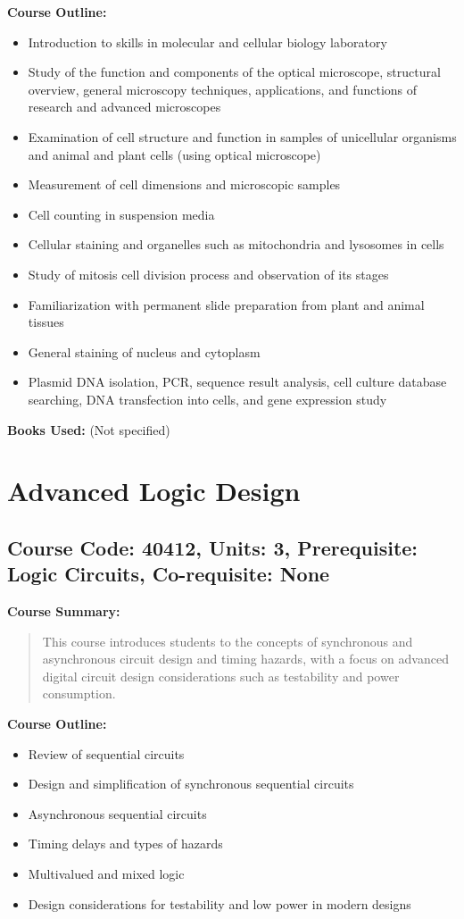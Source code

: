 \documentclass[12pt]{article}
\begin{document}
\textbf{Course Outline:}
\begin{itemize}
    \item Introduction to skills in molecular and cellular biology laboratory
    \item Study of the function and components of the optical microscope, structural overview, general microscopy techniques, applications, and functions of research and advanced microscopes
    \item Examination of cell structure and function in samples of unicellular organisms and animal and plant cells (using optical microscope)
    \item Measurement of cell dimensions and microscopic samples
    \item Cell counting in suspension media
    \item Cellular staining and organelles such as mitochondria and lysosomes in cells
    \item Study of mitosis cell division process and observation of its stages
    \item Familiarization with permanent slide preparation from plant and animal tissues
    \item General staining of nucleus and cytoplasm
    \item Plasmid DNA isolation, PCR, sequence result analysis, cell culture database searching, DNA transfection into cells, and gene expression study
\end{itemize}

\textbf{Books Used:}
(Not specified)

\newpage

\section{Advanced Logic Design}
\subsection*{Course Code: 40412, Units: 3, Prerequisite: Logic Circuits, Co-requisite: None}

\textbf{Course Summary:} 
\begin{quote}
   This course introduces students to the concepts of synchronous and asynchronous circuit design and timing hazards, with a focus on advanced digital circuit design considerations such as testability and power consumption.
\end{quote}

\textbf{Course Outline:}
\begin{itemize}
    \item Review of sequential circuits
    \item Design and simplification of synchronous sequential circuits
    \item Asynchronous sequential circuits
    \item Timing delays and types of hazards
    \item Multivalued and mixed logic
    \item Design considerations for testability and low power in modern designs
\end{itemize}
\end{document}
